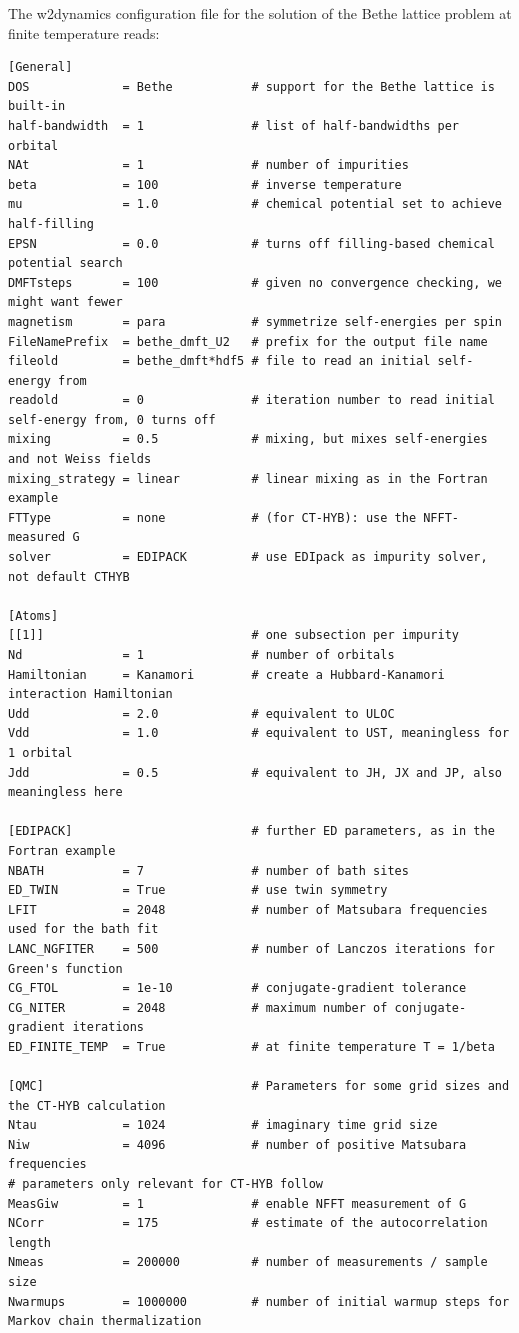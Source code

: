 \documentclass[edipack_sp.tex]{subfiles}
\begin{document}
The w2dynamics configuration file for the solution of the Bethe lattice problem at finite temperature reads: 
\begin{lstlisting}[style=mybash,language={},numbers=none,basicstyle={\scriptsize\ttfamily}]
[General]
DOS             = Bethe           # support for the Bethe lattice is built-in
half-bandwidth  = 1               # list of half-bandwidths per orbital
NAt             = 1               # number of impurities
beta            = 100             # inverse temperature
mu              = 1.0             # chemical potential set to achieve half-filling
EPSN            = 0.0             # turns off filling-based chemical potential search
DMFTsteps       = 100             # given no convergence checking, we might want fewer
magnetism       = para            # symmetrize self-energies per spin
FileNamePrefix  = bethe_dmft_U2   # prefix for the output file name
fileold         = bethe_dmft*hdf5 # file to read an initial self-energy from
readold         = 0               # iteration number to read initial self-energy from, 0 turns off
mixing          = 0.5             # mixing, but mixes self-energies and not Weiss fields
mixing_strategy = linear          # linear mixing as in the Fortran example
FTType          = none            # (for CT-HYB): use the NFFT-measured G
solver          = EDIPACK         # use EDIpack as impurity solver, not default CTHYB

[Atoms]
[[1]]                             # one subsection per impurity
Nd              = 1               # number of orbitals
Hamiltonian     = Kanamori        # create a Hubbard-Kanamori interaction Hamiltonian
Udd             = 2.0             # equivalent to ULOC
Vdd             = 1.0             # equivalent to UST, meaningless for 1 orbital
Jdd             = 0.5             # equivalent to JH, JX and JP, also meaningless here

[EDIPACK]                         # further ED parameters, as in the Fortran example
NBATH           = 7               # number of bath sites
ED_TWIN         = True            # use twin symmetry
LFIT            = 2048            # number of Matsubara frequencies used for the bath fit
LANC_NGFITER    = 500             # number of Lanczos iterations for Green's function
CG_FTOL         = 1e-10           # conjugate-gradient tolerance
CG_NITER        = 2048            # maximum number of conjugate-gradient iterations
ED_FINITE_TEMP  = True            # at finite temperature T = 1/beta

[QMC]                             # Parameters for some grid sizes and the CT-HYB calculation
Ntau            = 1024            # imaginary time grid size
Niw             = 4096            # number of positive Matsubara frequencies
# parameters only relevant for CT-HYB follow
MeasGiw         = 1               # enable NFFT measurement of G
NCorr           = 175             # estimate of the autocorrelation length
Nmeas           = 200000          # number of measurements / sample size
Nwarmups        = 1000000         # number of initial warmup steps for Markov chain thermalization
\end{lstlisting}
\end{document}
